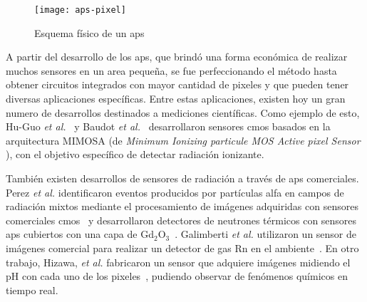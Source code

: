 \begin{figure}[]
	\centering
	\texttt{[image: aps-pixel]}
	\caption{Esquema físico de un \acrshort{aps}~\cite{Turchetta2019}}
	\label{fig:pix}
\end{figure}

A partir del desarrollo de los \acrshort{aps}, que brindó una forma económica de realizar muchos sensores en un area pequeña, se fue perfeccionando el método hasta obtener circuitos integrados con mayor cantidad de pixeles y que pueden tener diversas aplicaciones específicas. Entre estas aplicaciones, existen hoy un gran numero de desarrollos destinados a mediciones científicas. Como ejemplo de esto, Hu-Guo \textit{et al.}~\cite{Hu-Guo2009} y Baudot \textit{et al.}~\cite{Baudot2009} desarrollaron sensores \acrshort{cmos} basados en la arquitectura MIMOSA (de {\it Minimum Ionizing particule MOS Active pixel Sensor}%
), con el objetivo específico de detectar radiación ionizante.%

También existen desarrollos de sensores de radiación a través de \acrshort{aps} comerciales. Perez {\it et al.} identificaron eventos producidos por partículas alfa en campos de radiación mixtos mediante el procesamiento de imágenes adquiridas con sensores comerciales \acrshort{cmos}~\cite{Perez2016} y desarrollaron detectores de neutrones térmicos con sensores \acrshort{aps} cubiertos con una capa de Gd$_2$O$_3$~\cite{Perez2018Thermal}. Galimberti {\it et al.} utilizaron un sensor de imágenes comercial para realizar un detector de gas Rn en el ambiente~\cite{Galimberti2018}. En otro trabajo, Hizawa, {\it et al.} fabricaron un sensor que adquiere imágenes midiendo el pH con cada uno de los pixeles~\cite{Hizawa2007}, pudiendo observar de fenómenos químicos en tiempo real.%


